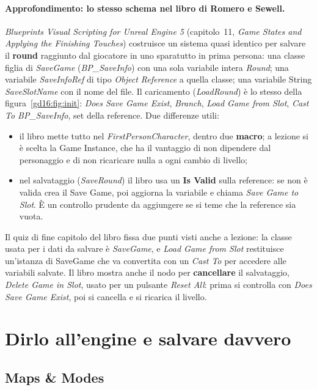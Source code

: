 \paragraph{Approfondimento: lo stesso schema nel libro di Romero e Sewell.}
\emph{Blueprints Visual Scripting for Unreal Engine 5} (capitolo~11, \emph{Game
States and Applying the Finishing Touches}) costruisce un sistema quasi
identico per salvare il \textbf{round} raggiunto dal giocatore in uno sparatutto
in prima persona: una classe figlia di \emph{SaveGame} (\emph{BP\_SaveInfo}) con
una sola variabile intera \emph{Round}; una variabile \emph{SaveInfoRef} di tipo
\emph{Object Reference} a quella classe; una variabile String
\emph{SaveSlotName} con il nome del file. Il caricamento (\emph{LoadRound}) è
lo stesso della figura~\ref{gd16:fig:init}: \emph{Does Save Game Exist},
\emph{Branch}, \emph{Load Game from Slot}, \emph{Cast To BP\_SaveInfo}, set
della reference. Due differenze utili:
\begin{itemize}
  \item il libro mette tutto nel \emph{FirstPersonCharacter}, dentro due
        \textbf{macro}; a lezione si è scelta la Game Instance, che ha il
        vantaggio di non dipendere dal personaggio e di non ricaricare nulla a
        ogni cambio di livello;
  \item nel salvataggio (\emph{SaveRound}) il libro usa un \textbf{Is Valid}
        sulla reference: se non è valida crea il Save Game, poi aggiorna la
        variabile e chiama \emph{Save Game to Slot}. È un controllo prudente
        da aggiungere se si teme che la reference sia vuota.
\end{itemize}
Il quiz di fine capitolo del libro fissa due punti visti anche a lezione: la
classe usata per i dati da salvare è \emph{SaveGame}, e \emph{Load Game from
Slot} restituisce un'istanza di SaveGame che va convertita con un \emph{Cast
To} per accedere alle variabili salvate. Il libro mostra anche il nodo per
\textbf{cancellare} il salvataggio, \emph{Delete Game in Slot}, usato per un
pulsante \emph{Reset All}: prima si controlla con \emph{Does Save Game Exist},
poi si cancella e si ricarica il livello.

\section{Dirlo all'engine e salvare davvero}
\label{gd16:sec:salvare}

\subsection{Maps \& Modes}

